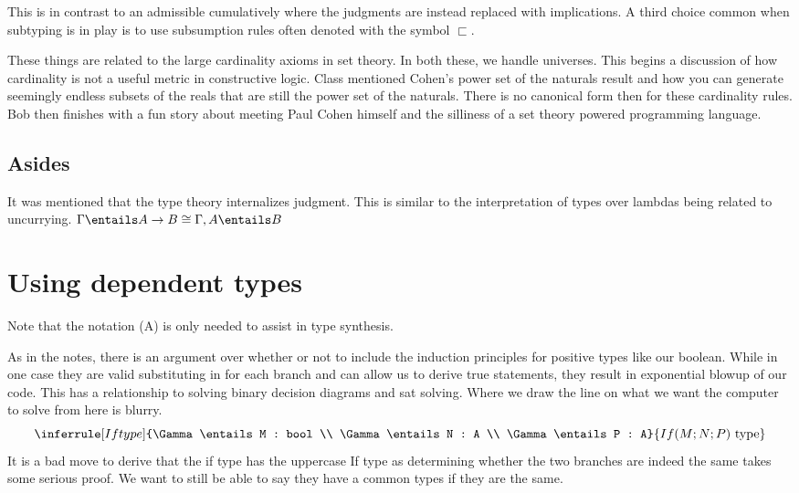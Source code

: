 \documentclass[11pt]{article}
\begin{document}
This is in contrast to an admissible cumulatively where the judgments are instead replaced with implications. A third choice common when subtyping is in play is to use subsumption rules often denoted with the symbol $\sqsubset$.

These things are related to the large cardinality axioms in set theory. In both these, we handle universes. This begins a discussion of how cardinality is not a useful metric in constructive logic. Class mentioned Cohen's power set of the naturals result and how you can generate seemingly endless subsets of the reals that are still the power set of the naturals. There is no canonical form then for these cardinality rules. Bob then finishes with a fun story about meeting Paul Cohen himself and the silliness of a set theory powered programming language.

\subsection*{Asides}
It was mentioned that the type theory internalizes judgment. This is similar to the interpretation of types over lambdas being related to uncurrying. $\Gamma \entails A \rightarrow B \cong \Gamma, A \entails B$
\section*{Using dependent types}
\begin{mathpar}



\end{mathpar}
Note that the notation (A) is only needed to assist in type synthesis.
\begin{mathpar}
\end{mathpar}
As in the notes, there is an argument over whether or not to include the induction principles for positive types like our boolean. While in one case they are valid substituting in for each branch and can allow us to derive true statements, they result in exponential blowup of our code. This has a relationship to solving binary decision diagrams and sat solving. Where we draw the line on what we want the computer to solve from here is blurry.
$$\inferrule[If type]{\Gamma \entails M : bool \\ \Gamma \entails N : A \\ \Gamma \entails P : A}{If(M; N; P)\text{ type}}$$
It is a bad move to derive that the if type has the uppercase If type as determining whether the two branches are indeed the same takes some serious proof. We want to still be able to say they have a common types if they are the same.
\end{document}
